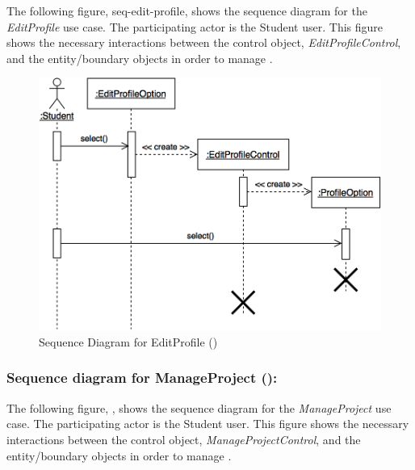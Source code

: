 \documentclass[12pt,letterpaper]{article}
\begin{document}
The following figure, {seq-edit-profile}, shows the sequence diagram for the {\it EditProfile} use case. The participating actor is the 
Student user. This figure shows the necessary interactions between the control object, {\it EditProfileControl}, and the entity/boundary objects
in order to manage .

\begin{figure}[H]
	\centering{}
	\includegraphics[scale=0.25]{imgs/seq/edit-profile.png}
	\caption[ - Sequence Diagram for EditProfile]{Sequence Diagram for EditProfile ()}
\end{figure}

\subsubsection*{Sequence diagram for ManageProject ():}

The following figure, , shows the sequence diagram for the {\it ManageProject} use case. The participating actor is the
Student user. This figure shows the necessary interactions between the control object, {\it ManageProjectControl}, and the entity/boundary objects 
in order to manage .
\end{document}
